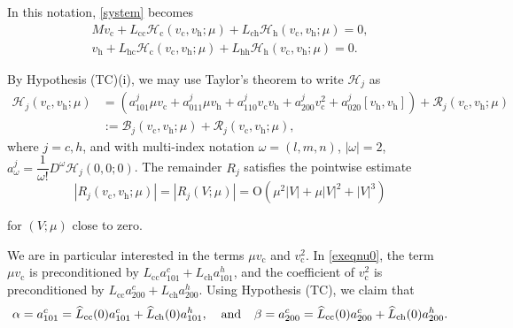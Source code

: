 \documentclass[10pt]{article}
\newcommand{\rmO}{\mathrm{O}}
\newcommand{\B}{\mathcal{B}}
\newcommand{\Rm}{\mathcal{R}}
\begin{document}
In this notation, \eqref{system} becomes
\begin{align}
M v_\mathrm{c} + L_\mathrm{cc}\mathcal{H}_\mathrm{c}(v_\mathrm{c},v_\mathrm{h};\mu) + L_\mathrm{ch}\mathcal{H}_\mathrm{h}(v_\mathrm{c},v_\mathrm{h};\mu)= 0\label{exeqnu0},\\
v_\mathrm{h} +  L_\mathrm{hc}\mathcal{H}_\mathrm{c}(v_\mathrm{c},v_\mathrm{h};\mu) + L_\mathrm{hh}\mathcal{H}_\mathrm{h}(v_\mathrm{c},v_\mathrm{h};\mu) = 0 \label{exeqnuh}.
\end{align}


By Hypothesis (TC)(i), we may use Taylor's theorem to write $\mathcal{H}_j$ as
\begin{align*}
\mathcal{H}_j(v_\mathrm{c},v_\mathrm{h};\mu) &=\left( a^j_{101} \mu v_\mathrm{c}+a^j_{011}\mu v_\mathrm{h}+a^j_{110}v_\mathrm{c}v_\mathrm{h} + a^j_{200}v_\mathrm{c}^2+a^j_{020}[v_\mathrm{h},v_\mathrm{h}] \right)+ \Rm_j(v_\mathrm{c},v_\mathrm{h};\mu)\\
&:= \B_j(v_\mathrm{c},v_\mathrm{h};\mu)+\Rm_j(v_\mathrm{c},v_\mathrm{h};\mu),
\end{align*}
where $j=c,h$, and with multi-index notation $\omega=(l,m,n)$, $|\omega|=2$, $a^j_{\omega} = \dfrac{1}{\omega !}D^{\omega} \mathcal{H}_j(0,0;0)$. The remainder $R_j$ satisfies the pointwise estimate
\begin{equation}\label{odR}
|R_j(v_\mathrm{c},v_\mathrm{h};\mu)| = |R_j(V;\mu)| = \rmO(\mu^2|V|+\mu|V|^2+|V|^3)
\end{equation} 


for $(V;\mu)$ close to zero.

We are in particular interested in the terms $\mu v_\mathrm{c}$ and $v_\mathrm{c}^2$. In \eqref{exeqnu0}, the term $\mu v_\mathrm{c}$ is preconditioned by $L_\mathrm{cc}a_{101}^c+L_\mathrm{ch}a_{101}^h$, and the coefficient of $v_\mathrm{c}^2$ is preconditioned by $L_\mathrm{cc}a_{200}^c+L_\mathrm{ch}a_{200}^h$. Using Hypothesis (TC), we claim that
\begin{equation}\label{e:alp}
\alpha = a_{101}^c =\widehat{L}_\mathrm{cc}(0)a_{101}^c+\widehat{L}_\mathrm{ch}(0)a_{101}^h , \hspace{0.1in}\text{ and }\hspace{0.1in}
\beta =a_{200}^c =\widehat{L}_\mathrm{cc}(0)a_{200}^c+\widehat{L}_\mathrm{ch}(0)a_{200}^h .
\end{equation}
\end{document}
